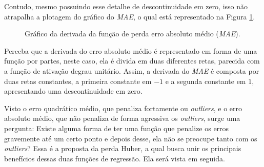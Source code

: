 Contudo, mesmo possuindo esse detalhe de descontinuidade em zero, isso não atrapalha a plotagem do gráfico do \textit{MAE}, o qual está representado na Figura \ref{fig:mae-derivada}.

\begin{figure}[h!]
    \centering
    \caption{Gráfico da derivada da função de perda erro absoluto médio (\textit{MAE}).}
    \label{fig:mae-derivada}
\end{figure}

Perceba que a derivada do erro absoluto médio é representado em forma de uma função por partes, neste caso, ela é divida em duas diferentes retas, parecida com a função de ativação degrau unitário. Assim, a derivada do \textit{MAE} é composta por duas retas constantes, a primeira constante em $-1$ e a segunda constante em $1$, apresentando uma descontinuidade em zero.

Visto o erro quadrático médio, que penaliza fortamente ou \textit{outliers}, e o erro absoluto médio, que não penaliza de forma agressiva os \textit{outliers}, surge uma pergunta: Existe alguma forma de ter uma função que penalize os erros gravemente até um certo ponto e depois desse, ela não se preocupe tanto com os \textit{outliers}? Essa é a proposta da perda Huber, a qual busca unir os principais benefícios dessas duas funções de regressão. Ela será vista em seguida.


